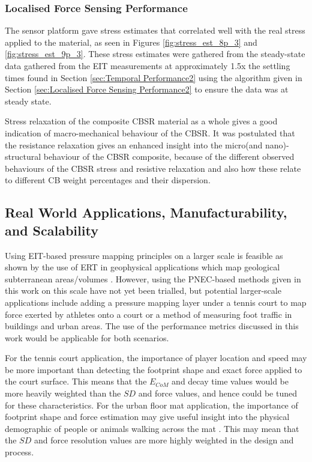 \subsubsection{Localised Force Sensing Performance}\label{sec:Localised Force Sensing Performance3}
The sensor platform gave stress estimates that correlated well with the real stress applied to the material, as seen in Figures \ref{fig:stress_est_8p_3} and \ref{fig:stress_est_9p_3}. These stress estimates were gathered from the steady-state data gathered from the EIT measurements at approximately 1.5x the settling times found in Section \ref{sec:Temporal Performance2} using the algorithm given in Section \ref{sec:Localised Force Sensing Performance2} to ensure the data was at steady state.

Stress relaxation of the composite CBSR material as a whole gives a good indication of macro-mechanical behaviour of the CBSR. It was postulated that the resistance relaxation gives an enhanced insight into the micro(and nano)-structural behaviour of the CBSR composite, because of the different observed behaviours of the CBSR stress and resistive relaxation and also how these relate to different CB weight percentages and their dispersion.


\subsection{Real World Applications, Manufacturability, and Scalability}
 Using EIT-based pressure mapping principles on a larger scale is feasible as shown by the use of ERT in geophysical applications which map geological subterranean areas/volumes \citep{Griffiths1993}. However, using the PNEC-based methods given in this work on this scale have not yet been trialled, but potential larger-scale applications include adding a pressure mapping layer under a tennis court to map force exerted by athletes onto a court or a method of measuring foot traffic in buildings and urban areas. The use of the performance metrics discussed in this work would be applicable for both scenarios. 

For the tennis court application, the importance of player location and speed may be more important than detecting the footprint shape and exact force applied to the court surface. This means that the $E_{CoM}$ and decay time values would be more heavily weighted than the $S\!D$ and force values, and hence could be tuned for these characteristics. For the urban floor mat application, the importance of footprint shape and force estimation may give useful insight into the physical demographic of people or animals walking across the mat \cite{Yuan2023}. This may mean that the $S\!D$ and force resolution values are more highly weighted in the design and process.

